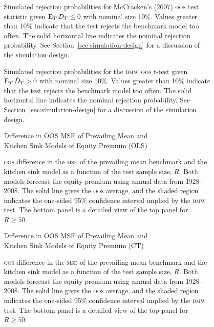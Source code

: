 \documentclass[11pt]{article}
\begin{document}
\begin{figure}
  
  \caption{Simulated rejection probabilities for McCracken's (2007)
    \protect \textsc{oos} test statistic given $\operatorname{E}_T \bar{D}_{T} \leq 0$ with
    nominal size 10\%.  Values greater than 10\% indicate that the
    test rejects the benchmark model too often.  The solid horizontal
    line indicates the nominal rejection probability.  See
    Section~\ref{sec:simulation-design} for a discussion of the
    simulation design.}
  \label{fig:mccracken}
\end{figure}

\begin{figure}
  \caption{Simulated rejection probabilities for the \protect \textsc{dmw}
    \protect\textsc{oos} $t$-test given $\operatorname{E}_T \bar{D}_{T} > 0$ with nominal
    size 10\%.  Values greater than 10\% indicate that the test
    rejects the benchmark model too often.  The solid horizontal line
    indicates the nominal rejection probability.  See
    Section~\ref{sec:simulation-design} for a discussion of the
    simulation design.}
  \label{fig:ttest-power}
\end{figure}

\begin{figure}
\centering
\large{Difference in OOS MSE of Prevailing Mean and\\ Kitchen
    Sink Models of Equity Premium (OLS)}


\caption{\protect \textsc{oos} difference in the \protect\textsc{mse}
  of the prevailing mean benchmark and the kitchen sink model as a
  function of the test sample size, $R$.  Both models forecast the
  equity premium using annual data from 1928--2008.  The solid line
  gives the \protect \textsc{oos} average, and the shaded region indicates the
  one-sided 95\% confidence interval implied by the \protect
  \textsc{dmw} test.  The bottom panel is a detailed view of the top
  panel for $R \geq 50$.}
\label{fig:empirics1}
\end{figure}

\begin{figure}
\centering
\large{Difference in OOS MSE of Prevailing Mean and\\ Kitchen
    Sink Models of Equity Premium (CT)}


\caption{\protect \textsc{oos} difference in the \protect\textsc{mse}
  of the prevailing mean benchmark and the kitchen sink model as a
  function of the test sample size, $R$.  Both models forecast the
  equity premium using annual data from 1928--2008.  The solid line
  gives the \protect \textsc{oos} average, and the shaded region indicates the
  one-sided 95\% confidence interval implied by the \protect
  \textsc{dmw} test.  The bottom panel is a detailed view of the top
  panel for $R \geq 50$.}
\label{fig:empirics2}
\end{figure}
\end{document}
